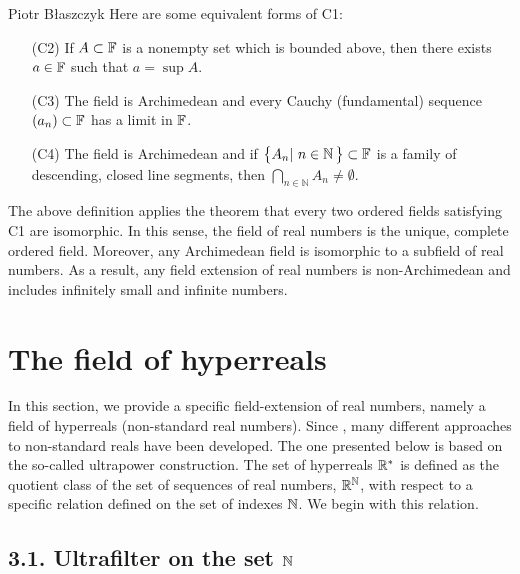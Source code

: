 \begin{artengenv}{Piotr Błaszczyk}
Here are some  equivalent forms of C1:

\begin{enumerate}\itemsep 0mm
\item [(C2)] If $A \subset {\mathbb{F}}$ is a nonempty set which is bounded above, then there exists $a \in {\mathbb{F}}$ such  that  $a = \sup A$.
\item [(C3)] The field  is Archimedean and every Cauchy (fundamental) sequence $(a_n)\subset {\mathbb{F}}$  has a limit in ${\mathbb{F}}$.
\item[(C4)] The field  is Archimedean  and
 if $\big\{A_{n}|\ n\in\mathbb{N}\ \!\big\}\subset \F$ is a family of descending, closed line segments, then $\bigcap\limits_{n\in\mathbb{N}} A_{n}\not=\emptyset.$
\end{enumerate}



The above definition applies the theorem that every two ordered fields satisfying C1 are isomorphic. In this sense, the field of real numbers is the unique, complete ordered field. Moreover, any Archimedean field is isomorphic to a subfield of real numbers.  As a result, any field extension of real numbers is non-Archimedean and includes infinitely small and infinite numbers.  
\section{The field of hyperreals}

In this section, we provide a specific field-extension of real numbers, namely a field of hyperreals (non-standard real numbers). Since \parencite{ref_RA}, many different approaches to non-standard reals have been developed. The one presented below is based on the so-called ultrapower construction.  The set of hyperreals  ${\mathbb{R}}^*$  is defined as the quotient class of the set of sequences of real numbers, ${\mathbb{R}}^{{\mathbb{N}}}$, with  respect to a specific relation defined on the set of indexes ${\mathbb{N}}$. We begin with this relation.


\subsection{3.1. Ultrafilter on the set ${\mathbb{N}}$}


\end{artengenv}
